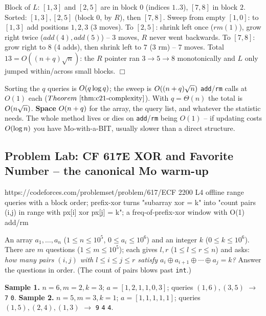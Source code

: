 \begin{tracebox}[The block order on \(n{=}9\), \(B{=}3\), three queries \(\lbrack 7,8\rbrack, \lbrack 1,3\rbrack, \lbrack 2,5\rbrack\)]
Block of \(L\): \([1,3]\) and \([2,5]\) are in block \(0\) (indices \(1..3\)), \([7,8]\)
in block \(2\).  Sorted: \([1,3],[2,5]\) (block 0, by \(R\)), then \([7,8]\).  Sweep from
empty \([1,0]\): to \([1,3]\) add positions \(1,2,3\) (3 moves).  To \([2,5]\): shrink
left once (\(rm(1)\)), grow right twice (\(add(4),add(5)\)) -- 3 moves, \(R\) never went
backwards.  To \([7,8]\): grow right to \(8\) (4 adds), then shrink left to \(7\) (3 rm)
-- 7 moves.  Total \(13 = O((n+q)\sqrt n)\): the \(R\) pointer ran \(3\!\to\!5\!\to\!8\)
monotonically and \(L\) only jumped within/across small blocks. \(\Box\)
\end{tracebox}

\begin{complexitybox}
Sorting the \(q\) queries is \(O(q\log q)\); the sweep is \(O((n+q)\sqrt n)\)
\texttt{add}/\texttt{rm} calls at \(O(1)\) each (\(\thmref{c21-complexity}\)). With
\(q=\Theta(n)\) the total is \(O(n\sqrt n)\). \textbf{Space} \(O(n+q)\) for
the array, the query list, and whatever the statistic needs. The whole method lives
or dies on \texttt{add}/\texttt{rm} being \(O(1)\) -- if updating costs \(O(\log n)\)
you have Mo-with-a-BIT, usually slower than a direct structure.
\end{complexitybox}

\subsection{Problem Lab: CF 617E XOR and Favorite Number -- the canonical Mo warm-up}

  {https://codeforces.com/problemset/problem/617/E}{CF 2200 L4}
  {offline range queries with a block order; prefix-xor turns "subarray xor = k" into "count pairs (i,j) in range with px[i] xor px[j] = k"; a freq-of-prefix-xor window with O(1) add/rm}

\begin{problemstatement}
An array \(a_1,\dots,a_n\) (\(1\le n\le 10^5\), \(0\le a_i\le 10^6\)) and an integer
\(k\) (\(0\le k\le 10^6\)).  There are \(m\) questions (\(1\le m\le 10^5\)); each gives
\(l,r\) (\(1\le l\le r\le n\)) and asks: \emph{how many pairs \((i,j)\) with
\(l\le i\le j\le r\) satisfy \(a_i \oplus a_{i+1}\oplus\cdots\oplus a_j = k\)?}
Answer the questions in order.  (The count of pairs blows past \texttt{int}.)

\textbf{Sample 1.} \(n{=}6,m{=}2,k{=}3\); \(a=[1,2,1,1,0,3]\); queries \((1,6),(3,5)\)
\(\to\) \texttt{7} \texttt{0}. \textbf{Sample 2.} \(n{=}5,m{=}3,k{=}1\);
\(a=[1,1,1,1,1]\); queries \((1,5),(2,4),(1,3)\) \(\to\) \texttt{9} \texttt{4} \texttt{4}.
\end{problemstatement}

